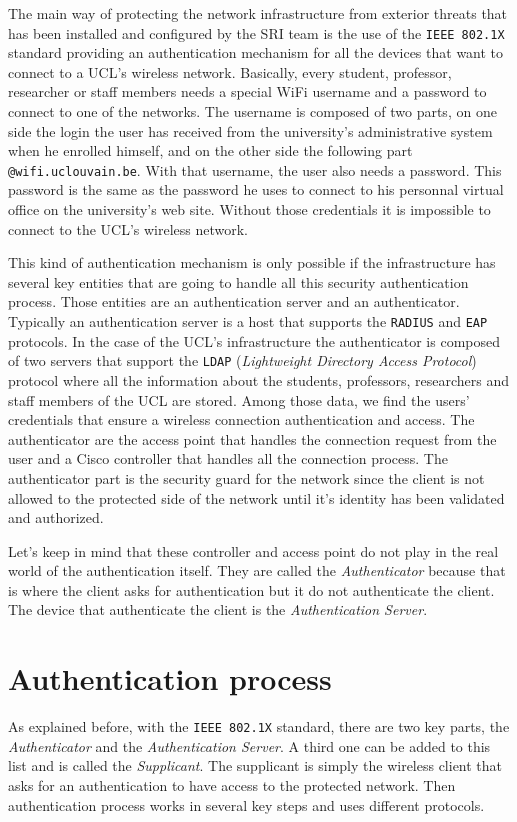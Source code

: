 The main way of protecting the network infrastructure from exterior threats that has been installed and configured by the SRI team is the use of the \texttt{IEEE 802.1X} standard providing an authentication mechanism for all the devices that want to connect to a UCL's wireless network.
Basically, every student, professor, researcher or staff members needs a special WiFi username and a password to connect to one of the networks. The username is composed of two parts, on one side the login the user has received from the university's administrative system when he enrolled himself, and on the other side the following part \texttt{@wifi.uclouvain.be}. With that username, the user also needs a password. This password is the same as the password he uses to connect to his personnal virtual office on the university's web site. Without those credentials it is impossible to connect to the UCL's wireless network.

This kind of authentication mechanism is only possible if the infrastructure has several key entities that are going to handle all this security authentication process. Those entities are an authentication server and an authenticator. Typically an authentication server is a host that supports the \texttt{RADIUS} and  \texttt{EAP} protocols. In the case of the UCL's infrastructure the authenticator is composed of two servers that support the \texttt{LDAP} (\textit{Lightweight Directory Access Protocol}) protocol where all the information about the students, professors, researchers and staff members of the UCL are stored. Among those data, we find the users' credentials that ensure a wireless connection authentication and access. The authenticator are the access point that handles the connection request from the user and a Cisco controller that handles all the connection process. The authenticator part is the security guard for the network since the client is not allowed to the protected side of the network until it's identity has been validated and authorized.

Let's keep in mind that these controller and access point do not play in the real world of the authentication itself. They are called the \textit{Authenticator} because that is where the client asks for authentication but it do not authenticate the client. The device that authenticate the client is the \textit{Authentication Server}.



\section{Authentication process}
As explained before, with the \texttt{IEEE 802.1X} standard, there are two key parts, the \textit{Authenticator} and the \textit{Authentication Server}. A third one can be added to this list and is called the \textit{Supplicant}. The supplicant is simply the wireless client that asks for an authentication to have access to the protected network. Then authentication process works in several key steps and uses different protocols.

